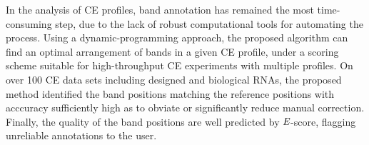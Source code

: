 In the analysis of CE profiles, band annotation has remained the most time-consuming step, due to the lack of robust computational tools for automating the process. Using a dynamic-programming approach, the proposed algorithm can find an optimal arrangement of bands in a given CE profile, under a scoring scheme suitable for high-throughput CE experiments with multiple profiles. On over 100 CE data sets including designed and biological RNAs, the proposed method identified the band positions matching the reference positions with acccuracy sufficiently high as to obviate or significantly reduce manual correction. Finally, the quality of the band positions are well predicted by ${\emph{E}}$-score, flagging unreliable annotations to the user.
